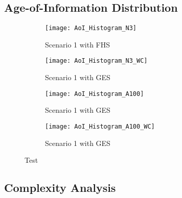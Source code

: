 \subsection{Age-of-Information Distribution}

\begin{figure}[htbp]
  \centering
  \begin{subfigure}[b]{0.49\textwidth}
      \centering
      \texttt{[image: AoI\_Histogram\_N3]}
      \caption{Scenario 1 with FHS}
  \end{subfigure}
  \hfill
  \begin{subfigure}[b]{0.49\textwidth}
      \centering
      \texttt{[image: AoI\_Histogram\_N3\_WC]}
      \caption{Scenario 1 with GES}
  \end{subfigure}
  \begin{subfigure}[b]{0.49\textwidth}
      \centering
      \texttt{[image: AoI\_Histogram\_A100]}
      \caption{Scenario 1 with GES}
  \end{subfigure}
  \begin{subfigure}[b]{0.49\textwidth}
      \centering
      \texttt{[image: AoI\_Histogram\_A100\_WC]}
      \caption{Scenario 1 with GES}
  \end{subfigure}
     \caption[Test]{Test}
     \label{fig:AoIHist}
\end{figure}

\subsection{Complexity Analysis}
